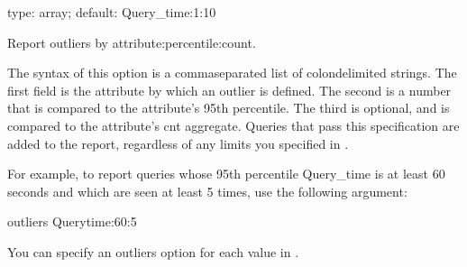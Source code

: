 \documentclass[letterpaper,10pt,english]{sphinxmanual}
\begin{document}
\begin{fulllineitems}
\label{\detokenize{mariadb-query-digest:cmdoption-mariadb-query-digest-outliers}}
type: array; default: Query\_time:1:10

Report outliers by attribute:percentile:count.

The syntax of this option is a comma\sphinxhyphen{}separated list of colon\sphinxhyphen{}delimited strings.
The first field is the attribute by which an outlier is defined.  The second is
a number that is compared to the attribute’s 95th percentile.  The third is
optional, and is compared to the attribute’s cnt aggregate.  Queries that pass
this specification are added to the report, regardless of any limits you
specified in {\hyperref[\detokenize{mariadb-query-digest:cmdoption-mariadb-query-digest-limit}]{}}.

For example, to report queries whose 95th percentile Query\_time is at least 60
seconds and which are seen at least 5 times, use the following argument:

\begin{sphinxVerbatim}[commandchars=\\\{\}]
\PYGZhy{}\PYGZhy{}outliers Query\PYGZus{}time:60:5
\end{sphinxVerbatim}

You can specify an \textendash{}outliers option for each value in {\hyperref[\detokenize{mariadb-query-digest:cmdoption-mariadb-query-digest-group-by}]{}}.

\end{fulllineitems}

\end{document}
